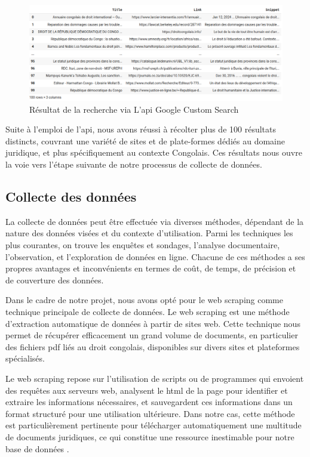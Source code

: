 \begin{figure}[H]
    \centering
    \includegraphics[width=15cm]{gfx/fig-google-search-result.png}
    \caption{Résultat de la recherche via L'\acs{api} Google Custom Search}
    \label{fig:google-search-result}
\end{figure}

Suite à l'emploi de l'\acs{api}, nous avons réussi à récolter plus de 100 résultats distincts, couvrant une variété de sites et de plate-formes dédiés au domaine juridique, et plus spécifiquement au contexte Congolais. Ces résultats nous ouvre la voie vers l'étape suivante de notre processus de collecte de données.

\subsection{Collecte des données}

La collecte de données peut être effectuée via diverses méthodes, dépendant de la nature des données visées et du contexte d'utilisation. Parmi les techniques les plus courantes, on trouve les enquêtes et sondages, l'analyse documentaire, l'observation, et l'exploration de données en ligne. Chacune de ces méthodes a ses propres avantages et inconvénients en termes de coût, de temps, de précision et de couverture des données.

Dans le cadre de notre projet, nous avons opté pour le web scraping comme technique principale de collecte de données. Le web scraping est une méthode d'extraction automatique de données à partir de sites web. Cette technique nous permet de récupérer efficacement un grand volume de documents, en particulier des fichiers \acs{pdf} liés au droit congolais, disponibles sur divers sites et plateformes spécialisés.

Le web scraping repose sur l'utilisation de scripts ou de programmes qui envoient des requêtes aux serveurs web, analysent le \acs{html} de la page pour identifier et extraire les informations nécessaires, et sauvegardent ces informations dans un format structuré pour une utilisation ultérieure. Dans notre cas, cette méthode est particulièrement pertinente pour télécharger automatiquement une multitude de documents juridiques, ce qui constitue une ressource inestimable pour notre base de données \cite{Chakrabarti_2002}.
 
